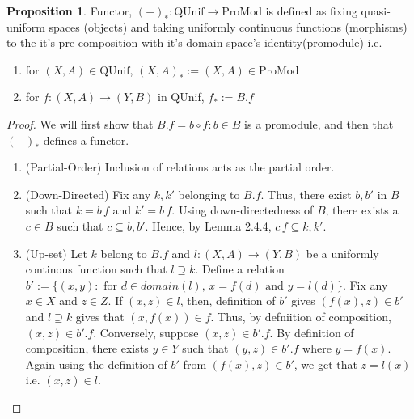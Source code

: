 \documentclass[18pt,a4paper]{article}
\theoremstyle{definition}
\newtheorem{proop}{Proposition}[section]
\begin{document}
\begin{proop} Functor, $(-)_*:\text{QUnif} \to \text{ProMod}$ is
	defined as fixing quasi-uniform spaces (objects) and taking
	uniformly continuous functions (morphisms) to the it's pre-composition with it's domain space's identity(promodule) i.e.
	\begin{enumerate}[label=(\alph*)]
		\item for $(X,A) \in \text{QUnif}$, $(X,A)_*:=(X,A) \in \text{ProMod}$
		\item for $f:(X,A) \to (Y,B)$ in QUnif,
			$f_* := B.f$
	\end{enumerate}
\end{proop}
\begin{proof}
	We will first show that $B.f={b \circ f: b \in B}$
	is a promodule, and then that $(-)_*$ defines a functor.
	\begin{enumerate}[label=(\roman*)]
		\item (Partial-Order) Inclusion of relations acts as the partial order.
		\item (Down-Directed) Fix any $k,k'$ belonging to $B.f$. Thus, there exist
			$b,b'$ in $B$ such that $k=b\,f$ and $k'=b\,f$. Using down-directedness
			of $B$, there exists a $c \in B$ such that $c \subseteq b,b'$. Hence,
			by Lemma 2.4.4, $c\,f \subseteq k,k'$.
		\item (Up-set) Let $k$ belong to $B.f$ and $l:(X,A) \to (Y,B)$ be a
			uniformly continous function such that $l \supseteq k$.
			Define a relation $b':= \{(x,y): \text{ for } d \in domain(l),\, x=f(d)
			\text{ and } y=l(d)\}$. Fix any $x \in X$ and $z \in Z$.
			If $(x,z) \in l$, then, definition of $b'$ gives $(f(x),z)\in b'$
			and $l \supseteq k$ gives that $(x,f(x)) \in f$. Thus, by defniition
			of composition, $(x,z) \in b'.f$. Conversely, suppose $(x,z) \in b'.f$.
			By definition of composition, there exists $y\in Y$ such that
			$(y,z) \in b'.f$ where $y=f(x)$. Again using the definition of
			$b'$ from $(f(x),z) \in b'$, we get that $z=l(x)$ i.e. $(x,z)\in l$.


\end{enumerate}
\end{proof}
\end{document}
